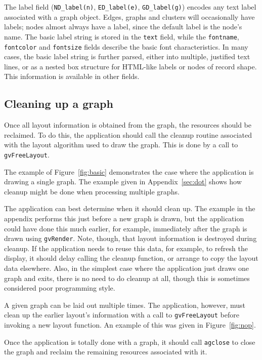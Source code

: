 The label field (\verb+ND_label(n)+, \verb+ED_label(e)+,
\verb+GD_label(g)+) encodes any text label associated with a graph object.
Edges, graphs and clusters will occasionally have labels; nodes
almost always have a label, since the default label is the node's name.
The basic label string is stored in the {\tt text} field, while the
{\tt fontname}, {\tt fontcolor} and {\tt fontsize} fields describe
the basic font characteristics.
In many cases, the basic label string is further parsed, either into
multiple, justified text lines, or as a nested box structure for
HTML-like labels or nodes of record shape.
This information is available in other fields.

\subsection{Cleaning up a graph}
\label{sec:clean}

Once all layout information is obtained from the graph, the resources
should be reclaimed. To do this, the application should call
the cleanup routine associated with the layout algorithm used to
draw the graph. This is done by a call to {\tt gvFreeLayout}.

The example of Figure~\ref{fig:basic}
demonstrates the case where the application is drawing a single graph.
The example given in Appendix~\ref{sec:dot}
shows how cleanup might be done when processing multiple graphs.

The application can best determine when it should clean up. The example
in the appendix
performs this just before a new graph is drawn, but the application could
have done this much earlier, for example, immediately after the graph
is drawn using {\tt gvRender}. Note, though, that layout information
is destroyed during cleanup. If the application needs to reuse this
data, for example, to refresh the display, it should delay calling the
cleanup function, or arrange to copy the layout data elsewhere.
Also, in the simplest case where the application just draws one graph
and exits, there is no need to do cleanup at all, though this is sometimes
considered poor programming style.

A given graph can be laid out multiple times.
The application, however, must clean up the earlier layout's
information with a call to {\tt gvFreeLayout}
before invoking a new layout function.
An example of this was given in Figure~\ref{fig:nop}.

Once the application is totally done with a graph, it should call
{\tt agclose} to close the graph and reclaim the remaining resources associated
with it.

